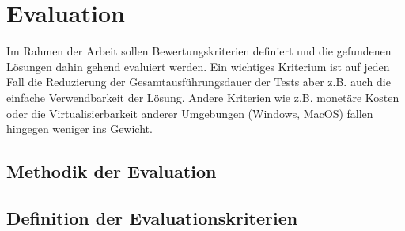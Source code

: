 \section{Evaluation}

Im Rahmen der Arbeit sollen Bewertungskriterien definiert und die gefundenen Lösungen dahin gehend evaluiert werden. Ein wichtiges Kriterium ist auf jeden Fall die Reduzierung der Gesamtausführungsdauer der Tests aber z.B. auch die einfache Verwendbarkeit der Lösung. Andere Kriterien wie z.B. monetäre Kosten oder die Virtualisierbarkeit anderer Umgebungen (Windows, MacOS) fallen hingegen weniger ins Gewicht.

\subsection{Methodik der Evaluation}

\subsection{Definition der Evaluationskriterien}
